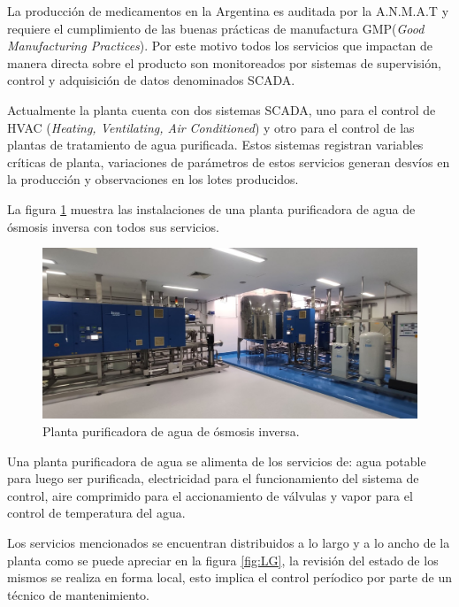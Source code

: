 La producción de medicamentos en la Argentina es auditada por la A.N.M.A.T \citep{ANMAT} y requiere el cumplimiento de las buenas prácticas de manufactura GMP(\emph{Good Manufacturing Practices}). Por este motivo todos los servicios que impactan de manera directa sobre el producto son monitoreados por sistemas de supervisión, control y adquisición de datos denominados SCADA.

Actualmente la planta cuenta con dos sistemas SCADA, uno para el control de HVAC (\emph{Heating, Ventilating, Air Conditioned}) y otro para el control de las plantas de tratamiento de agua purificada. Estos sistemas registran variables críticas de planta, variaciones de parámetros de estos servicios generan desvíos en la producción y observaciones en los lotes producidos.

La figura \ref{fig:PWNB} muestra las instalaciones de una planta purificadora de agua de ósmosis inversa con todos sus servicios.

\begin{figure}[htbp]
	\centering
	\includegraphics[width=1\textwidth]{./Figures/PWNB.png}
	\caption{Planta purificadora de agua de ósmosis inversa.}
	\label{fig:PWNB}
\end{figure}

Una planta purificadora de agua se alimenta de los servicios de: agua potable para luego ser purificada, electricidad para el funcionamiento del sistema de control, aire comprimido para el accionamiento de válvulas y vapor para el control de temperatura del agua.

Los servicios mencionados se encuentran distribuidos a lo largo y a lo ancho de la planta como se puede apreciar en la figura \ref{fig:LG}, la revisión del estado de los mismos se realiza en forma local, esto implica el control períodico por parte de un técnico de mantenimiento.


